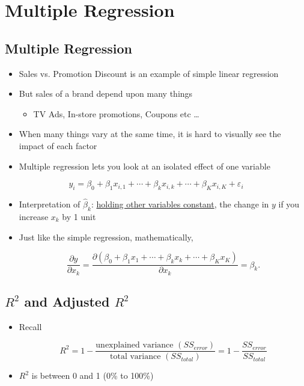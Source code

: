 \documentclass[10pt,article]{article}
\begin{document}
\section{Multiple Regression}
\label{sec:orge809cd4}
\subsection{Multiple Regression}
\label{sec:org2bbb0e9}
\begin{itemize}
\item Sales vs. Promotion Discount is an example of simple linear regression
\item But sales of a brand depend upon many things
\begin{itemize}
\item TV Ads, In-store promotions, Coupons etc \ldots{}
\end{itemize}

\item When many things vary at the same time, it is hard to visually see the
impact of each factor
\item Multiple regression lets you look at an isolated effect of one variable
\end{itemize}

\[ y_{i} = \beta_0 + \beta_1 x_{i, 1} + \cdots + \beta_k x_{i, k} + \cdots +
\beta_K x_{i, K} + \varepsilon_{i} \]

\begin{itemize}
\item Interpretation of \(\hat{\beta}_k\): \uline{holding other variables constant}, the
change in \(y\) if you increase \(x_k\) by 1 unit

\item Just like the simple regression, mathematically,

\[ \dfrac{\partial y}{\partial x_k} = \dfrac{\partial ( \beta_0 + \beta_1 x_1 + \cdots + \beta_k
  x_k + \cdots + \beta_K x_K) }{\partial x_k } = \beta_k. \]
\end{itemize}

\subsection{\(R^2\) and Adjusted \(R^2\)}
\label{sec:org0d168a0}
\begin{itemize}
\item Recall

\[
     R^2 = 1 - \dfrac{\text{unexplained variance } (SS_{error})}
           {\text{total variance } (SS_{total})} = 1 - \dfrac{SS_{error}}{SS_{total}}
  \]

\item \(R^2\) is between 0 and 1 (0\% to 100\%)
\end{itemize}
\end{document}
